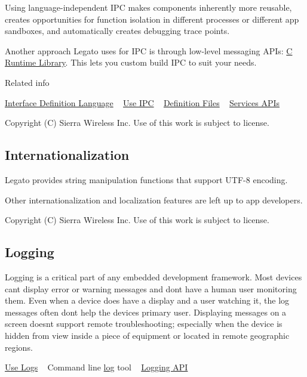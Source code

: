 Using language-\/independent I\+P\+C makes components inherently more reusable, creates opportunities for function isolation in different processes or different app sandboxes, and automatically creates debugging trace points.

Another approach Legato uses for I\+P\+C is through low-\/level messaging A\+P\+Is\+: \hyperlink{c_APIs}{C Runtime Library}. This let\textquotesingle{}s you custom build I\+P\+C to suit your needs.

Related info

\hyperlink{interfaceDefLang}{Interface Definition Language} ~\newline
 \hyperlink{basicAppsIPC}{Use I\+P\+C} ~\newline
 \hyperlink{defFiles}{Definition Files} ~\newline
 \hyperlink{legatoServices}{Services A\+P\+Is}





Copyright (C) Sierra Wireless Inc. Use of this work is subject to license. \hypertarget{basicInternationalization}{}\subsection{Internationalization}\label{basicInternationalization}
Legato provides string manipulation functions that support U\+T\+F-\/8 encoding.

Other internationalization and localization features are left up to app developers.





Copyright (C) Sierra Wireless Inc. Use of this work is subject to license. \hypertarget{basicLog}{}\subsection{Logging}\label{basicLog}
Logging is a critical part of any embedded development framework. Most devices can\textquotesingle{}t display error or warning messages and don\textquotesingle{}t have a human user monitoring them. Even when a device does have a display and a user watching it, the log messages often don\textquotesingle{}t help the device\textquotesingle{}s primary user. Displaying messages on a screen doesn\textquotesingle{}t support remote troubleshooting; especially when the device is hidden from view inside a piece of equipment or located in remote geographic regions.

\hyperlink{howToLogs}{Use Logs} ~\newline
 Command line \hyperlink{toolsTarget_log}{log} tool ~\newline
 \hyperlink{c_logging}{Logging A\+P\+I}






